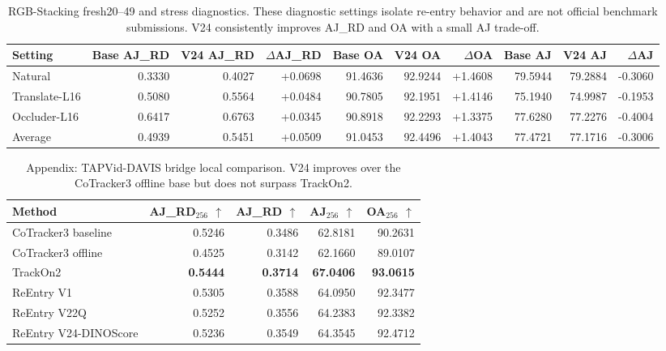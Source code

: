 \begin{table}[t]
\centering
\caption{RGB-Stacking fresh20--49 and stress diagnostics. These diagnostic settings isolate re-entry behavior and are not official benchmark submissions. V24 consistently improves AJ\_RD and OA with a small AJ trade-off.}
\label{tab:fresh_stress}
\small
\begin{adjustbox}{max width=\textwidth}
\begin{tabular}{lrrrrrrrrr}
\toprule
Setting & Base AJ\_RD & V24 AJ\_RD & $\Delta$AJ\_RD & Base OA & V24 OA & $\Delta$OA & Base AJ & V24 AJ & $\Delta$AJ \\
\midrule
Natural & 0.3330 & 0.4027 & +0.0698 & 91.4636 & 92.9244 & +1.4608 & 79.5944 & 79.2884 & -0.3060 \\
Translate-L16 & 0.5080 & 0.5564 & +0.0484 & 90.7805 & 92.1951 & +1.4146 & 75.1940 & 74.9987 & -0.1953 \\
Occluder-L16 & 0.6417 & 0.6763 & +0.0345 & 90.8918 & 92.2293 & +1.3375 & 77.6280 & 77.2276 & -0.4004 \\
\midrule
Average & 0.4939 & 0.5451 & +0.0509 & 91.0453 & 92.4496 & +1.4043 & 77.4721 & 77.1716 & -0.3006 \\
\bottomrule
\end{tabular}
\end{adjustbox}
\end{table}

\begin{table}[t]
\centering
\caption{Appendix: TAPVid-DAVIS bridge local comparison. V24 improves over the CoTracker3 offline base but does not surpass TrackOn2.}
\label{tab:davis_bridge_appendix}
\small
\begin{adjustbox}{max width=\textwidth}
\begin{tabular}{lrrrr}
\toprule
Method & AJ\_RD$_{256}$ $\uparrow$ & AJ\_RD $\uparrow$ & AJ$_{256}$ $\uparrow$ & OA$_{256}$ $\uparrow$ \\
\midrule
CoTracker3 baseline & 0.5246 & 0.3486 & 62.8181 & 90.2631 \\
CoTracker3 offline & 0.4525 & 0.3142 & 62.1660 & 89.0107 \\
TrackOn2 & \textbf{0.5444} & \textbf{0.3714} & \textbf{67.0406} & \textbf{93.0615} \\
ReEntry V1 & 0.5305 & 0.3588 & 64.0950 & 92.3477 \\
ReEntry V22Q & 0.5252 & 0.3556 & 64.2383 & 92.3382 \\
ReEntry V24-DINOScore & 0.5236 & 0.3549 & 64.3545 & 92.4712 \\
\bottomrule
\end{tabular}
\end{adjustbox}
\end{table}

